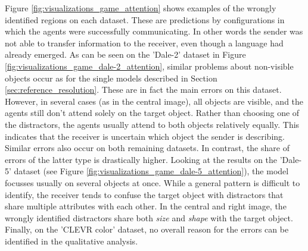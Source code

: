 Figure \ref{fig:visualizations_game_attention} shows examples of the wrongly identified regions on each dataset.
These are predictions by configurations in which the agents were successfully communicating.
In other words the sender was not able to transfer information to the receiver, even though a language had already emerged.
As can be seen on the 'Dale-2' dataset in Figure \ref{fig:visualizations_game_dale-2_attention}, similar problems about non-visible objects occur as for the single models described in Section \ref{sec:reference_resolution}.
These are in fact the main errors on this dataset.
However, in several cases (as in the central image), all objects are visible, and the agents still don't attend solely on the target object.
Rather than choosing one of the distractors, the agents usually attend to both objects relatively equally.
This indicates that the receiver is uncertain which object the sender is describing.
Similar errors also occur on both remaining datasets.
In contrast, the share of errors of the latter type is drastically higher.
Looking at the results on the 'Dale-5' dataset (see Figure \ref{fig:visualizations_game_dale-5_attention}), the model focusses usually on several objects at once.
While a general pattern is difficult to identify, the receiver tends to confuse the target object with distractors that share multiple attributes with each other.
In the central and right image, the wrongly identified distractors share both \emph{size} and \emph{shape} with the target object.
Finally, on the 'CLEVR color' dataset, no overall reason for the errors can be identified in the qualitative analysis.



